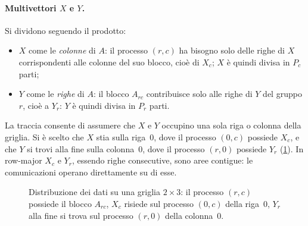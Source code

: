 \documentclass[11pt,a4paper]{article}
\begin{document}
\paragraph{Multivettori $X$ e $Y$.} Si dividono seguendo il prodotto:
\begin{itemize}
  \item $X$ come le \emph{colonne} di $A$: il processo $(r, c)$ ha bisogno solo
        delle righe di $X$ corrispondenti alle colonne del suo blocco, cioè di
        $X_c$; $X$ è quindi divisa in $P_c$ parti;
  \item $Y$ come le \emph{righe} di $A$: il blocco $A_{rc}$ contribuisce solo
        alle righe di $Y$ del gruppo $r$, cioè a $Y_r$: $Y$ è quindi divisa in
        $P_r$ parti.
\end{itemize}
La traccia consente di assumere che $X$ e $Y$ occupino una sola riga o colonna
della griglia. Si è scelto che $X$ stia sulla riga~0, dove il processo
$(0, c)$ possiede $X_c$, e che $Y$ si trovi alla fine sulla colonna~0, dove il
processo $(r, 0)$ possiede $Y_r$ (\cref{fig:distribuzione}). In row-major $X_c$ e $Y_r$, essendo righe consecutive, sono aree contigue: le
comunicazioni operano direttamente su di esse.

\begin{figure}[H]
  \centering
  \caption{Distribuzione dei dati su una griglia $2 \times 3$: il processo
    $(r, c)$ possiede il blocco $A_{rc}$, $X_c$ risiede sul processo $(0, c)$
    della riga~0, $Y_r$ alla fine si trova sul processo $(r, 0)$ della
    colonna~0.}\label{fig:distribuzione}
\end{figure}
\end{document}
